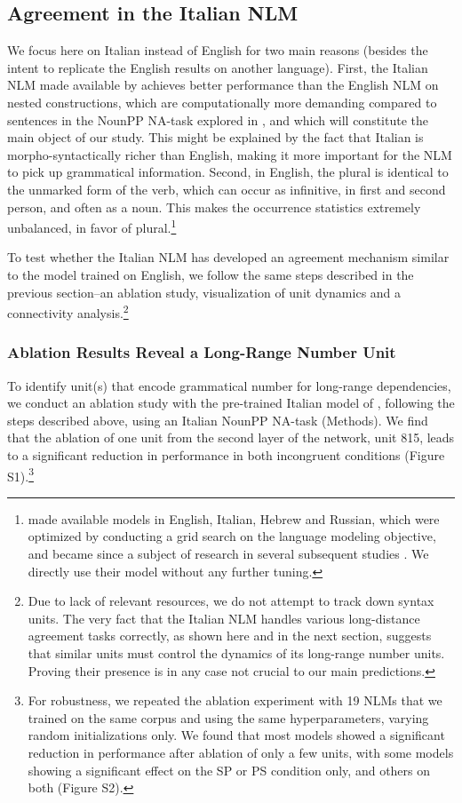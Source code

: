 \subsection{Agreement in the Italian NLM}
We focus here on Italian instead of English for two main reasons (besides the intent to replicate the English results on another language). First, the Italian NLM made available by \citet{Gulordava:etal:2018} achieves better performance than the English NLM on nested constructions, which are computationally more demanding compared to sentences in the NounPP NA-task explored in \citet{lakretz2019emergence}, and which will constitute the main object of our study. This might be explained by the fact that Italian is morpho-syntactically richer than English, making it more important for the NLM to pick up grammatical information. Second, in English, the plural is identical to the unmarked form of the verb, which can occur as infinitive, in first and second person, and often as a noun. This makes the occurrence statistics extremely unbalanced, in favor of plural.\footnote{\citet{Gulordava:etal:2018} made available models in English, Italian, Hebrew and Russian, which were optimized by conducting a grid search on the language modeling objective, and became since a subject of research in several subsequent studies \citep{Giulianelli:etal:2018, jumelet2019analysing, wilcox2018rnn, futrell2019neural}. We directly use their model without any further tuning.}

To test whether the Italian NLM has developed an agreement mechanism similar to the model trained on English, we follow the same steps described in the previous section--an ablation study, visualization of unit dynamics and a connectivity analysis.\footnote{Due to lack of relevant resources, we do not attempt to track down syntax units. The very fact that the Italian NLM handles various long-distance agreement tasks correctly, as shown here and in the next section, suggests that similar units must control the dynamics of its long-range number units. Proving their presence is in any case not crucial to our main predictions.}

\subsubsection{Ablation Results Reveal a Long-Range Number Unit} To identify unit(s) that encode grammatical number for long-range dependencies, we conduct an ablation study with the pre-trained Italian model of \citet{Gulordava:etal:2018}, following the steps described above, using an Italian NounPP NA-task (Methods). 
We find that the ablation of one unit from the second layer of the network, unit 815, leads to a significant reduction in performance in both incongruent conditions (Figure S1).\footnote{For robustness, we repeated the ablation experiment with 19 NLMs that we trained on the same corpus and using the same hyperparameters, varying random initializations only. We found that most models showed a significant reduction in performance after ablation of only a few units, with some models showing a significant effect on the SP or PS condition only, and others on both (Figure S2).}

